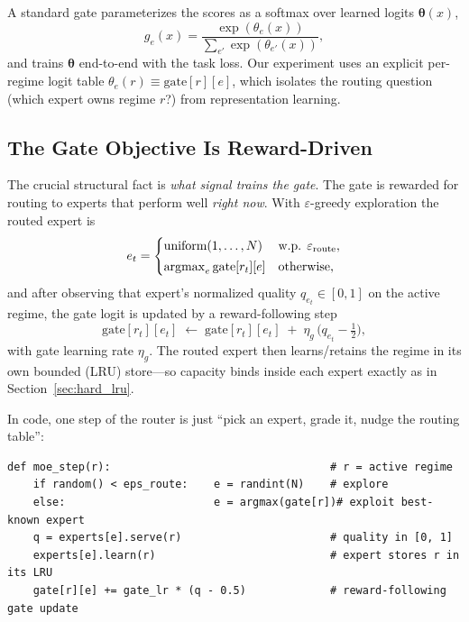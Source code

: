 \documentclass[11pt,a4paper]{article}
\theoremstyle{definition}
\theoremstyle{plain}
\newcommand{\argmax}{\operatornamewithlimits{argmax}}
\begin{document}
A standard gate parameterizes the scores as a softmax over learned logits
$\boldsymbol{\theta}(x)$,
\[
g_e(x) = \frac{\exp(\theta_e(x))}{\sum_{e'} \exp(\theta_{e'}(x))},
\]
and trains $\boldsymbol{\theta}$ end-to-end with the task loss. Our experiment
uses an explicit per-regime logit table $\theta_e(r) \equiv \mathrm{gate}[r][e]$,
which isolates the routing question (which expert owns regime $r$?) from
representation learning.

\subsection{The Gate Objective Is Reward-Driven}
\label{sec:gate_objective}

The crucial structural fact is \emph{what signal trains the gate}. The gate is
rewarded for routing to experts that perform well \emph{right now}. With
$\varepsilon$-greedy exploration the routed expert is
\[
e_t = \begin{cases}
\text{uniform}(1,\ldots,N) & \text{w.p. } \varepsilon_{\text{route}},\\[2pt]
\argmax_e \mathrm{gate}[r_t][e] & \text{otherwise,}
\end{cases}
\]
and after observing that expert's normalized quality $q_{e_t} \in [0,1]$ on the
active regime, the gate logit is updated by a reward-following step
\begin{equation}
\mathrm{gate}[r_t][e_t] \;\leftarrow\; \mathrm{gate}[r_t][e_t] \;+\; \eta_g\,\bigl(q_{e_t} - \tfrac12\bigr),
\label{eq:gate_update}
\end{equation}
with gate learning rate $\eta_g$. The routed expert then learns/retains the
regime in its own bounded (LRU) store---so capacity binds inside each expert
exactly as in Section~\ref{sec:hard_lru}.

In code, one step of the router is just ``pick an expert, grade it, nudge the
routing table'':

\begin{lstlisting}
def moe_step(r):                                  # r = active regime
    if random() < eps_route:    e = randint(N)    # explore
    else:                       e = argmax(gate[r])# exploit best-known expert
    q = experts[e].serve(r)                       # quality in [0, 1]
    experts[e].learn(r)                           # expert stores r in its LRU
    gate[r][e] += gate_lr * (q - 0.5)             # reward-following gate update
\end{lstlisting}
\end{document}

